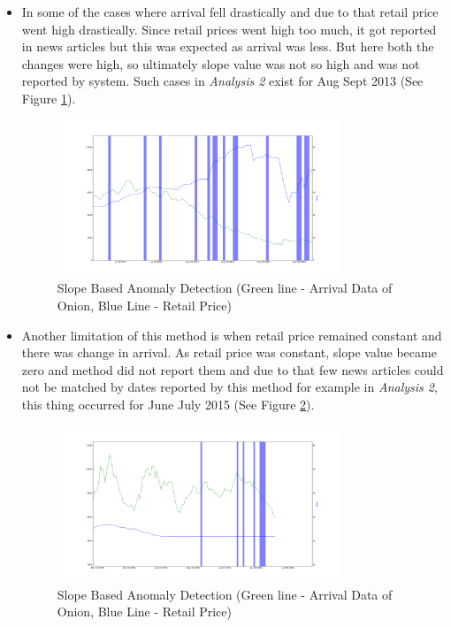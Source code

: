 \documentclass[a4paper,10pt]{report}
\begin{document}
\begin{itemize}
			\item In some of the cases where arrival fell drastically and due to that retail price went high drastically. Since retail prices went high too much, it got reported in news articles but this was expected as arrival was less. But here both the changes were high, so ultimately slope value was not so high and was not reported by system. Such cases in \textit{Analysis 2} exist for Aug Sept 2013  (See Figure \ref{fig:12125}).
			
			\begin{figure}[H]
		    	\centering
  		    	\includegraphics[width=0.8\textwidth]{graphs/12125.png}
		    	\caption{Slope Based Anomaly Detection (Green line - Arrival Data of Onion, Blue Line - Retail Price)}
		    	\label{fig:12125}
			\end{figure}
			
			\item Another limitation of this method is when retail price remained constant and there was change in arrival. As retail price was constant, slope value became zero and method did not report them and due to that few news articles could not be matched by dates reported by this method for example in \textit{Analysis 2}, this thing occurred for June July 2015  (See Figure \ref{fig:12126}).
			
			\begin{figure}[H]
		    	\centering
  		    	\includegraphics[width=0.8\textwidth]{graphs/12126.png}
		    	\caption{Slope Based Anomaly Detection (Green line - Arrival Data of Onion, Blue Line - Retail Price)}
		    	\label{fig:12126}
			\end{figure}
			
		\end{itemize}
\end{document}
